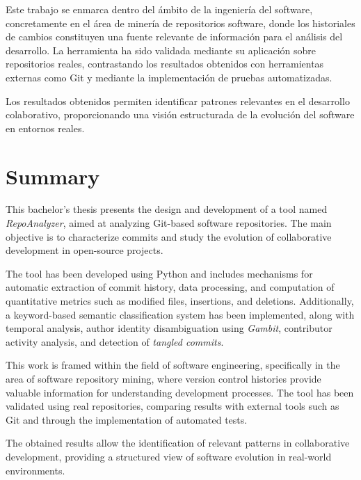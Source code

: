 \documentclass[a4paper, 12pt]{book}
\begin{document}
Este trabajo se enmarca dentro del ámbito de la ingeniería del software, concretamente en el área de minería de repositorios software, donde los historiales de cambios constituyen una fuente relevante de información para el análisis del desarrollo. La herramienta ha sido validada mediante su aplicación sobre repositorios reales, contrastando los resultados obtenidos con herramientas externas como Git y mediante la implementación de pruebas automatizadas.

Los resultados obtenidos permiten identificar patrones relevantes en el desarrollo colaborativo, proporcionando una visión estructurada de la evolución del software en entornos reales.


\chapter*{Summary}

This bachelor's thesis presents the design and development of a tool named \emph{RepoAnalyzer}, aimed at analyzing Git-based software repositories. The main objective is to characterize commits and study the evolution of collaborative development in open-source projects.

The tool has been developed using Python and includes mechanisms for automatic extraction of commit history, data processing, and computation of quantitative metrics such as modified files, insertions, and deletions. Additionally, a keyword-based semantic classification system has been implemented, along with temporal analysis, author identity disambiguation using \emph{Gambit}, contributor activity analysis, and detection of \emph{tangled commits}.

This work is framed within the field of software engineering, specifically in the area of software repository mining, where version control histories provide valuable information for understanding development processes. The tool has been validated using real repositories, comparing results with external tools such as Git and through the implementation of automated tests.

The obtained results allow the identification of relevant patterns in collaborative development, providing a structured view of software evolution in real-world environments.
\end{document}
